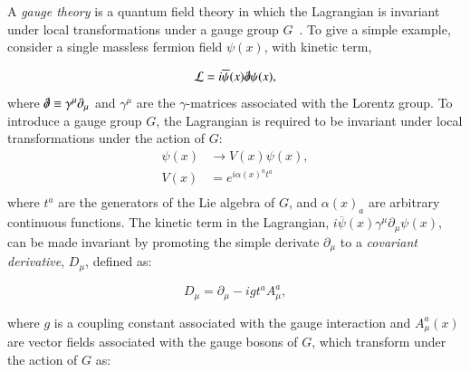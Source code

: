 
A \emph{gauge theory} is a quantum field theory in which the Lagrangian is invariant under local transformations under a gauge group $G$~\cite{peskinschroeder}. To give a simple example, consider a single massless fermion field $\psi(x)$, with kinetic term,

\begin{equation}
	\mathcal{L} = i\overline{\psi}(x) \slashed{\partial} \psi(x),
\end{equation}
where $\slashed{\partial}\equiv \gamma^{\mu}\partial_{\mu}$ and $\gamma^{\mu}$ are the $\gamma$-matrices associated with the Lorentz group. To introduce a gauge group $G$, the Lagrangian is required to be invariant under local transformations under the action of $G$:
 \begin{align*}
 	\psi(x) &\rightarrow V(x) \psi(x), \\
 	V(x) &= e^{i\alpha(x)^a t^a} \\
 \end{align*}
 where $t^a$ are the generators of the Lie algebra of $G$, and $\alpha(x)_a$ are arbitrary continuous functions. The kinetic term in the Lagrangian, $i\overline{\psi}(x)\gamma^{\mu}\partial_{\mu}\psi(x)$, can be made invariant by promoting the simple derivate $\partial_{\mu}$ to a \emph{covariant derivative}, $D_{\mu}$, defined as:

\begin{equation}\label{eqn:covariant-derivative-qcd}
	D_{\mu} = \partial_{\mu} - i g t^a A^a_{\mu},
\end{equation}

where $g$ is a coupling constant associated with the gauge interaction and $A^a_{\mu}(x)$ are vector fields associated with the gauge bosons of $G$, which transform under the action of $G$ as:

